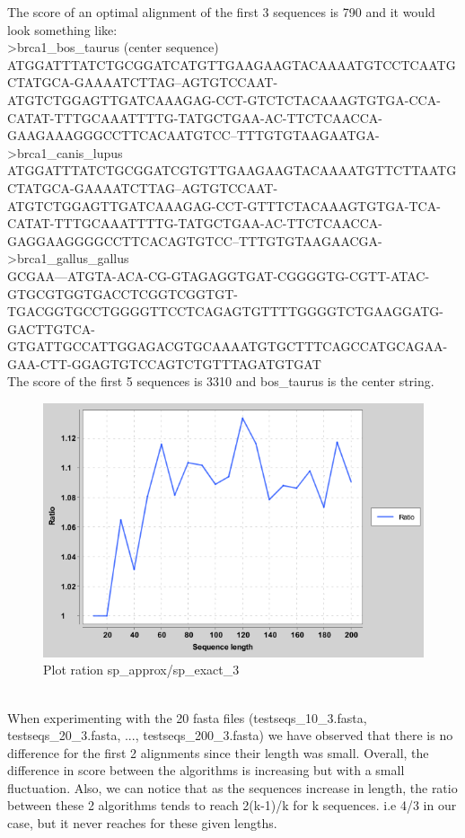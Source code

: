 \documentclass[12pt,a4paper]{article}
\begin{document}
	The score of an optimal alignment of the first 3 sequences is 790 and it would look something like:
	\\
	\textgreater brca1\_bos\_taurus (center sequence)
	\\
ATGGATTTATCTGCGGATCATGTTGAAGAAGTACAAAATGTCCTCAATGCTATGCA-GAAAATCTTAG--AGTGTCCAAT-ATGTCTGGAGTTGATCAAAGAG-CCT-GTCTCTACAAAGTGTGA-CCA-CATAT-TTTGCAAATTTTG-TATGCTGAA-AC-TTCTCAACCA-GAAGAAAGGGCCTTCACAATGTCC--TTTGTGTAAGAATGA-
\textgreater brca1\_canis\_lupus
\\
ATGGATTTATCTGCGGATCGTGTTGAAGAAGTACAAAATGTTCTTAATGCTATGCA-GAAAATCTTAG--AGTGTCCAAT-ATGTCTGGAGTTGATCAAAGAG-CCT-GTTTCTACAAAGTGTGA-TCA-CATAT-TTTGCAAATTTTG-TATGCTGAA-AC-TTCTCAACCA-GAGGAAGGGGCCTTCACAGTGTCC--TTTGTGTAAGAACGA-
\textgreater brca1\_gallus\_gallus
\\
GCGAA---ATGTA-ACA-CG-GTAGAGGTGAT-CGGGGTG-CGTT-ATAC-GTGCGTGGTGACCTCGGTCGGTGT-TGACGGTGCCTGGGGTTCCTCAGAGTGTTTTGGGGTCTGAAGGATG-GACTTGTCA-GTGATTGCCATTGGAGACGTGCAAAATGTGCTTTCAGCCATGCAGAA-GAA-CTT-GGAGTGTCCAGTCTGTTTAGATGTGAT
\\
	The score of the first 5 sequences is 3310 and bos\_taurus is the center string.
	\\
	\begin{figure}[h]
  \includegraphics[width=\linewidth]{plotRatio.png}
  \caption{Plot ration sp\_approx/sp\_exact\_3}
  \label{fig:microservQuestion}
\end{figure}
\\
When experimenting with the 20 fasta files (testseqs\_10\_3.fasta, testseqs\_20\_3.fasta, ..., testseqs\_200\_3.fasta) we have observed that there is no difference for the first 2 alignments since their length was small. Overall, the difference in score between the algorithms is increasing but with a small fluctuation. Also, we can notice that as the sequences increase in length, the ratio between these 2 algorithms tends to reach 2(k-1)/k for k sequences. i.e 4/3 in our case, but it never reaches for these given lengths.
	
\end{document}
